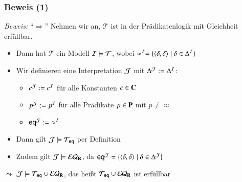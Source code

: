 \documentclass[onlymath]{beamer}
\begin{document}
\begin{frame}[t]\frametitle{Beweis (1)}


\emph{Beweis:} "`$\Rightarrow$"' Nehmen wir an, $\mathcal{T}$ ist in der Prädikatenlogik mit Gleichheit erfüllbar.\pause
\begin{itemize}
\item Dann hat $\mathcal{T}$ ein Modell $\mathcal{I}\models\mathcal{T}$, wobei $\approx^{\mathcal{I}}=\{\langle{\delta,\delta}\rangle\mid \delta\in\Delta^{\mathcal{I}}\}$\pause
\item Wir definieren eine Interpretation $\mathcal{J}$ mit $\Delta^{\mathcal{J}}\mathrel{:=}\Delta^{\mathcal{I}}$:
	\begin{itemize}
	\item $c^{\mathcal{J}}\mathrel{:=} c^{\mathcal{I}}$ für alle Konstanten $c\in\textbf{\textcolor{black}{C}}$
	\item $p^{\mathcal{J}}\mathrel{:=} p^{\mathcal{I}}$ für alle Prädikate $p\in\textbf{\textcolor{black}{P}}$ mit $p\neq{\approx}$
	\item $\textsf{eq}^{\mathcal{J}}\mathrel{:=} {\approx^{\mathcal{I}}}$
	\end{itemize}\pause
\item Dann gilt $\mathcal{J}\models\mathcal{T}_{\textsf{eq}}$ per Definition\pause
\item Zudem gilt $\mathcal{J}\models\mathcal{EQ}_{\textbf{\textcolor{black}{R}}}$, da $\textsf{eq}^{\mathcal{J}}=\{\langle{\delta,\delta}\rangle\mid \delta\in\Delta^{\mathcal{J}}\}$\pause
\end{itemize}
$\leadsto$ $\mathcal{J}\models\mathcal{T}_{\textsf{eq}}\cup\mathcal{EQ}_{\textbf{\textcolor{black}{R}}}$, das heißt $\mathcal{T}_{\textsf{eq}}\cup\mathcal{EQ}_{\textbf{\textcolor{black}{R}}}$ ist erfüllbar
\end{frame}
\end{document}
